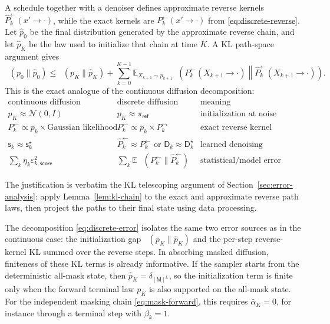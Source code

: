 \documentclass{amsart}
\numberwithin{equation}{section}
\theoremstyle{plain}
\theoremstyle{definition}
\theoremstyle{remark}
\DeclareMathOperator{\KL}{D_{\mathsf{KL}}}
\newcommand{\E}{\mathbb{E}}
\newcommand{\Id}{I}
\newcommand{\wh}[1]{\widehat{#1}}
\newcommand{\sstar}{\mathsf{s}^{\star}}
\newcommand{\score}{\mathsf{s}}
\newcommand{\dstar}{\mathsf{D}^{\star}}
\newcommand{\denoiser}{\mathsf{D}}
\newcommand{\epsscorek}{\varepsilon_{k,\mathsf{score}}}
\newcommand{\normal}[2]{\mathcal{N}\!\left(#1,#2\right)}
\begin{document}
A schedule together with a denoiser defines approximate reverse kernels
$\wh P_k^{\leftarrow}(x' \to \cdot)$, while the exact kernels are
$P_k^{\leftarrow}(x' \to \cdot)$ from \eqref{eq:discrete-reverse}.  Let
$\wh p_0$ be the final distribution generated by the approximate reverse chain,
and let $\wh p_K$ be the law used to initialize that chain at time $K$.  A KL
path-space argument gives
\begin{equation}\label{eq:discrete-error}
    \KL(p_0\|\wh p_0)
    \leq
    \KL(p_K\|\wh p_K)
    +
    \sum_{k=0}^{K-1}
    \E_{X_{k+1}\sim p_{k+1}}
    \KL\!\left(
    P_k^{\leftarrow}(X_{k+1} \to \cdot)
    \middle\|
    \wh P_k^{\leftarrow}(X_{k+1} \to \cdot)
    \right).
\end{equation}
This is the exact analogue of the continuous diffusion decomposition:
\[
\begin{array}{c|c|c}
\text{continuous diffusion} & \text{discrete diffusion} & \text{meaning}\\
\hline
p_K\approx\normal{0}{\Id} & p_K\approx\pi_{\mathsf{ref}} &
\text{initialization at noise}\\
P_k^{\leftarrow}\propto p_k\times\text{Gaussian likelihood} &
P_k^{\leftarrow}\propto p_k\times P_k^{\to} &
\text{exact reverse kernel}\\
\score_k\approx\sstar_k & \wh P_k^{\leftarrow}\approx P_k^{\leftarrow}
\text{ or }\denoiser_k\approx\dstar_k &
\text{learned denoising information}\\
\sum_k\eta_k\epsscorek^2 &
\sum_k\E\,\KL(P_k^{\leftarrow}\|\wh P_k^{\leftarrow}) &
\text{statistical/model error}
\end{array}
\]

The justification is verbatim the KL telescoping argument of
Section~\ref{sec:error-analysis}: apply Lemma~\ref{lem:kl-chain} to the exact
and approximate reverse path laws, then project the paths to their final state
using data processing.

The decomposition \eqref{eq:discrete-error} isolates the same two error sources
as in the continuous case: the initialization gap $\KL(p_K\|\wh p_K)$ and the
per-step reverse-kernel KL summed over the reverse steps.  In absorbing masked
diffusion, finiteness of these KL terms is already informative.  If the sampler
starts from the deterministic all-mask state, then
$\wh p_K=\delta_{[\mathsf M]^L}$, so the initialization term is finite only when
the forward terminal law $p_K$ is also supported on the all-mask state.  For the
independent masking chain \eqref{eq:mask-forward}, this requires
$\bar\alpha_K=0$, for instance through a terminal step with $\beta_k=1$.
\end{document}
